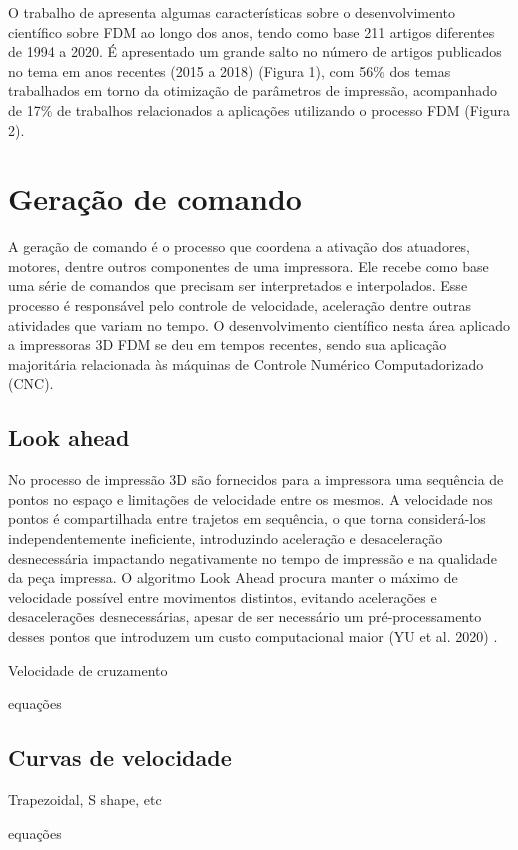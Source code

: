 O trabalho de \cite{vyavahare20} apresenta algumas 
características sobre o desenvolvimento científico sobre 
FDM ao longo dos anos, tendo como base 211 artigos diferentes 
de 1994 a 2020. É apresentado um grande salto no número de 
artigos publicados no tema em anos recentes (2015 a 2018) 
(Figura 1), com 56\% dos temas trabalhados em torno da 
otimização de parâmetros de impressão, acompanhado de 17\% de 
trabalhos relacionados a aplicações utilizando o processo FDM 
(Figura 2).

\section{Geração de comando}
A geração de comando é o processo que coordena a ativação dos 
atuadores, motores, dentre outros componentes de uma impressora. 
Ele recebe como base uma série de comandos que precisam ser 
interpretados e interpolados. Esse processo é responsável pelo 
controle de velocidade, aceleração dentre outras atividades que 
variam no tempo. O desenvolvimento científico nesta área 
aplicado a impressoras 3D FDM se deu em tempos recentes, 
sendo sua aplicação majoritária relacionada às máquinas de 
Controle Numérico Computadorizado (CNC).

\subsection{Look ahead}
No processo de impressão 3D são fornecidos para a impressora 
uma sequência de pontos no espaço e limitações de velocidade 
entre os mesmos. A velocidade nos pontos é compartilhada entre 
trajetos em sequência, o que torna considerá-los 
independentemente ineficiente, introduzindo aceleração e 
desaceleração desnecessária impactando negativamente no tempo 
de impressão e na qualidade da peça impressa.
O algoritmo Look Ahead procura manter o máximo de velocidade 
possível entre movimentos distintos, evitando acelerações e 
desacelerações desnecessárias, apesar de ser necessário um 
pré-processamento desses pontos que introduzem um custo 
computacional maior (YU et al. 2020) \cite{yu20}.

Velocidade de cruzamento

equações

\subsection{Curvas de velocidade}
Trapezoidal, S shape, etc

equações


